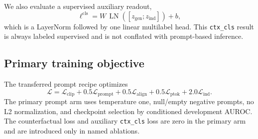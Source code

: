 \documentclass[10pt,twocolumn]{article}
\begin{document}
We also evaluate a supervised auxiliary readout,
\begin{equation}
\ell^{\mathrm{cls}} = W\,\operatorname{LN}
([z_{\mathrm{gen}};z_{\mathrm{ind}}])+b,
\end{equation}
which is a LayerNorm followed by one linear multilabel head. This
\texttt{ctx\_cls} result is always labeled supervised and is not conflated with
prompt-based inference.

\subsection{Primary training objective}
The transferred prompt recipe optimizes
\begin{equation}
\mathcal{L}=\mathcal{L}_{\mathrm{clip}}
+0.5\mathcal{L}_{\mathrm{prompt}}
+0.5\mathcal{L}_{\mathrm{align}}
+0.5\mathcal{L}_{\mathrm{ptok}}
+2.0\mathcal{L}_{\mathrm{ind}}.
\end{equation}
The primary prompt arm uses temperature one, null/empty negative prompts, no
L2 normalization, and checkpoint selection by conditioned development AUROC.
The counterfactual loss and auxiliary \texttt{ctx\_cls} loss are zero in the
primary arm and are introduced only in named ablations.
\end{document}
